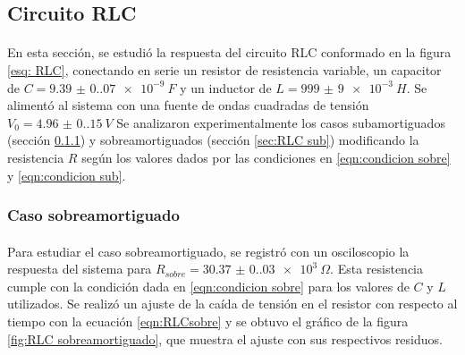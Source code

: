 \subsection{Circuito RLC}\label{sec: RLC}
\paragraph{}
En esta sección, se estudió la respuesta del circuito RLC conformado en la figura \ref{esq: RLC}, conectando en serie un resistor de resistencia variable, un capacitor de $C=\SI{9.39(0.07)e-9}{F}$ y un inductor de $L=\SI{999(9)e-3}{H}$. Se alimentó al sistema con una fuente de ondas cuadradas de tensión $V_0=\SI{4.96(0.15)}{V}$ Se analizaron experimentalmente los casos subamortiguados (sección \ref{sec:RLC sobre}) y sobreamortiguados (sección \ref{sec:RLC sub}) modificando la resistencia $R$ según los valores dados por las condiciones en \eqref{eqn:condicion sobre} y \eqref{eqn:condicion sub}.

\subsubsection{Caso sobreamortiguado}\label{sec:RLC sobre}
\paragraph{}
Para estudiar el caso sobreamortiguado, se registró con un osciloscopio la respuesta del sistema para $R_{sobre}=\SI{30.37(0.03)e3}{\Omega}$. Esta resistencia cumple con la condición dada en \eqref{eqn:condicion sobre} para los valores de $C$ y $L$ utilizados. Se realizó un ajuste de la caída de tensión en el resistor con respecto al tiempo con la ecuación \eqref{eqn:RLCsobre} y se obtuvo el gráfico de la figura \ref{fig:RLC sobreamortiguado}, que muestra el ajuste con sus respectivos residuos.

